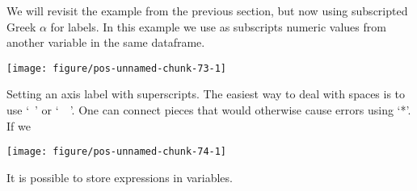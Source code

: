 \documentclass[paper=a4,10pt,div=17,headsepline,BCOR=12mm,twoside,open=right]{scrbook}\usepackage{knitr}
\begin{document}
We will revisit the example from the previous section, but now using subscripted Greek $\alpha$ for labels. In this example we use as subscripts numeric values from another variable in the same dataframe.

\begin{knitrout}\footnotesize
{}\color{fgcolor}\begin{kframe}
\begin{alltt}
\hlopt{$} \hlkwb{<-} \hlstd{(}\hlstr{"alpha["}\hlopt{$} \hlstr{"]"}\hlstd{,} \hlstd{=}\hlstd{)}
 \hlkwb{<-}   \hlopt{+}
   \hlstd{(}\hlstd{=}\hlstd{,} \hlstd{=}\hlstd{,} \hlstd{=}\hlstd{)} \hlopt{+} \hlstd{())}
\end{alltt}
\end{kframe}

{\centering \texttt{[image: figure/pos-unnamed-chunk-73-1]} 

}



\end{knitrout}

Setting an axis label with superscripts. The easiest way to deal with spaces is to use `~' or `~~'. One can connect pieces that would otherwise cause errors using `*'. If we

\begin{knitrout}\footnotesize
{}\color{fgcolor}\begin{kframe}
\begin{alltt}
 \hlopt{+} \hlstd{(}\hlstd{=} \hlstd{=}\hlopt{~~}\hlopt{~}\hlopt{^}\hlstd{\{}\hlopt{-}\hlstd{\})))}
\end{alltt}
\end{kframe}

{\centering \texttt{[image: figure/pos-unnamed-chunk-74-1]} 

}



\end{knitrout}

It is possible to store expressions in variables.
\end{document}
